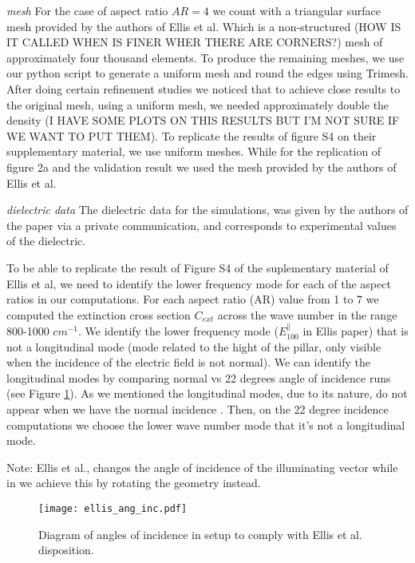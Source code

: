 \textit{mesh}
For the case of aspect ratio $AR=4$ we count with a triangular surface mesh provided by the authors of 
Ellis et al. Which is a non-structured (HOW IS IT CALLED WHEN IS FINER WHER THERE ARE CORNERS?) mesh of
approximately four thousand elements. To produce the remaining 
meshes, we use our python script to generate a uniform mesh and round the edges using Trimesh. 
After doing certain refinement studies we noticed that to achieve close results to the original mesh, using a
uniform mesh, we needed approximately double the density (I HAVE SOME PLOTS ON THIS RESULTS BUT 
I'M NOT SURE IF WE WANT TO PUT THEM).
To replicate the results of figure S4 on their supplementary material, we use uniform meshes. While for the 
replication of figure 2a and the validation result we used the mesh provided by the authors of Ellis et al. 


\textit{dielectric data}
The dielectric data for the simulations, was given by the authors of the paper via a private communication, 
and corresponds to experimental values of the dielectric. 

To be able to replicate the result of Figure S4 of the suplementary material of Ellis et al, we
need to identify the lower frequency mode for each of
the aspect ratios in our computations. For each aspect ratio (AR) 
value from 1 to 7 we computed the extinction cross section $C_{ext}$ across the wave number in the range
800-1000 $cm^{-1}$. We identify the lower frequency mode ($E^{\parallel}_{100}$ in Ellis paper)  that is not a 
longitudinal mode (mode related to the hight of the pillar, only visible when the incidence of the 
electric field is not normal). We can identify the longitudinal modes by comparing normal vs 22 degrees 
angle of incidence runs (see Figure \ref{fig:ellis_ang_inc}). As we mentioned the longitudinal modes, due to its nature, do not appear when we 
have the normal incidence . Then, on the 22 degree incidence computations we choose the lower wave number mode
that it's not a longitudinal mode. 

Note: Ellis et al., changes the angle of incidence of the illuminating vector while in \pygbe we achieve this by
rotating the geometry instead. 

\begin{figure}
    \centering
    \texttt{[image: ellis\_ang\_inc.pdf]} 
    \caption{Diagram of angles of incidence in \pygbe setup to comply with Ellis et al. disposition.}
    \label{fig:ellis_ang_inc}
 \end{figure}

